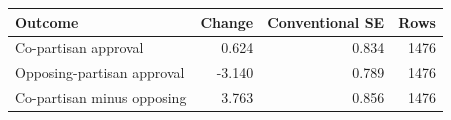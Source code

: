 \begin{tabular}{lrrr}
\toprule
Outcome & Change & Conventional SE & Rows \\
\midrule
Co-partisan approval & 0.624 & 0.834 & 1476 \\
Opposing-partisan approval & -3.140 & 0.789 & 1476 \\
Co-partisan minus opposing & 3.763 & 0.856 & 1476 \\
\bottomrule
\end{tabular}
